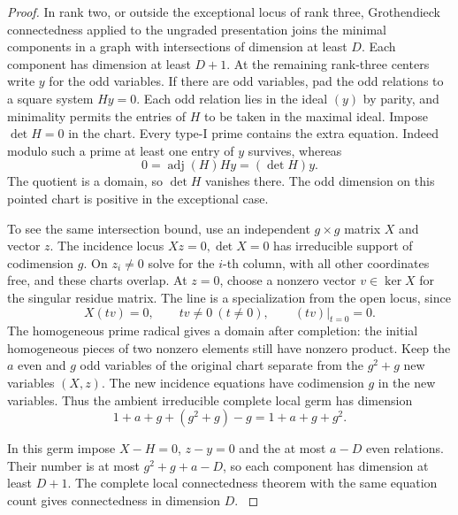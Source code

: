 \begin{proof}
In rank two, or outside the exceptional locus of rank three,
Grothendieck connectedness applied to the ungraded presentation
joins the minimal components in a graph with intersections
of dimension at least \(D\). Each component has dimension at
least \(D+1\). At the remaining rank-three centers write \(y\)
for the odd variables. If there are odd variables, pad the odd
relations to a square system \(H y=0\). Each odd relation lies
in the ideal \((y)\) by parity, and minimality permits the
entries of \(H\) to be taken in the maximal ideal. Impose
\(\det H=0\) in the chart. Every type-I prime contains the extra equation. Indeed modulo such a prime at least one entry of \(y\) survives, whereas
\[
 0=\operatorname{adj}(H)Hy=(\det H)y.
\]
The quotient is a domain, so \(\det H\) vanishes there. The odd dimension on this pointed chart is positive in the exceptional case.

To see the same intersection bound, use an independent
\(g\times g\) matrix \(X\) and vector \(z\). The incidence
locus \(Xz=0,\det X=0\) has irreducible support of codimension
\(g\). On \(z_i\ne0\) solve for the \(i\)-th column, with
all other coordinates free, and these charts overlap. At \(z=0\), choose a nonzero vector \(v\in\ker X\) for the singular residue matrix. The line is a specialization from the open locus, since
\[
 X(tv)=0,\qquad tv\ne0\ (t\ne0),\qquad (tv)|_{t=0}=0 .
\] The homogeneous prime radical gives a domain after
completion: the initial homogeneous pieces of two nonzero
elements still have nonzero product. Keep the \(a\) even and
\(g\) odd variables of the original chart separate from the
\(g^2+g\) new variables \((X,z)\). The new incidence equations
have codimension \(g\) in the new variables. Thus the ambient
irreducible complete local germ has dimension
\[
             1+a+g+(g^2+g)-g=1+a+g+g^2.
\]

In this germ impose \(X-H=0\), \(z-y=0\) and the at most
\(a-D\) even relations. Their number is at most
\(g^2+g+a-D\), so each component has dimension at least
\(D+1\). The complete local connectedness theorem with the
same equation count gives connectedness in dimension \(D\).
\cite{stacks-connectedness}


\end{proof}
